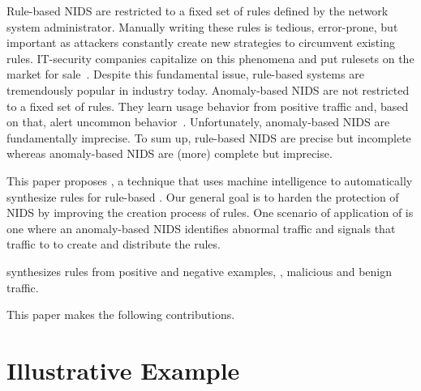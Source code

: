 \documentclass[runningheads]{llncs}
\begin{document}
Rule-based NIDS are restricted to a fixed set of rules defined by the
network system administrator. Manually writing these rules is tedious,
error-prone, but important as attackers constantly create new
strategies to circumvent existing rules. IT-security companies
capitalize on this phenomena and put rulesets on the market for
sale~\cite{proofpoint-etpro,snort-rule-subscriptions}.  Despite this
fundamental issue, rule-based systems are tremendously popular in
industry today. Anomaly-based NIDS are not restricted to a fixed set
of rules. They learn usage behavior from positive traffic and, based
on that, alert uncommon behavior~\cite{7579764}. Unfortunately,
anomaly-based NIDS are fundamentally imprecise. To sum up, rule-based
NIDS are precise but incomplete whereas anomaly-based NIDS are (more)
complete but imprecise.


This paper proposes \tname{}, a technique that uses machine
intelligence to automatically synthesize rules for rule-based
\nids. Our general goal is to harden the protection of NIDS by
improving the creation process of rules. One scenario of application
of \tname{} is one where an anomaly-based NIDS identifies abnormal
traffic and signals that traffic to \tname{} to create and distribute
the rules.


\tname{} synthesizes rules from positive and negative examples, \ie{},
malicious and benign traffic.



This paper makes the following contributions.

\section{Illustrative Example}
\label{sec:suri-metas-coverage}
\end{document}
